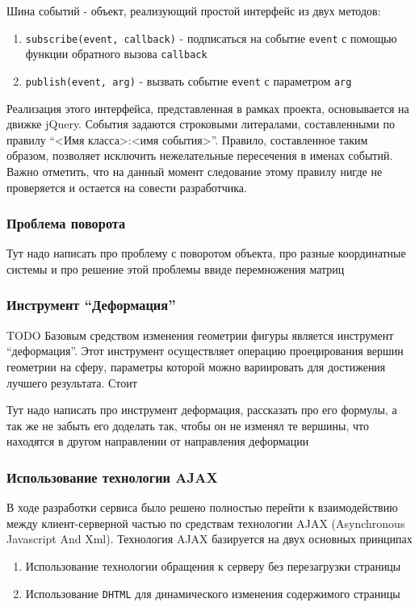\documentclass[12pt, a4paper]{article}
\begin{document}
Шина событий - объект, реализующий простой интерфейс из двух методов:
\begin{enumerate}
    \item \texttt{subscribe(event, callback)} - подписаться на событие
    \texttt{event} с помощью функции обратного вызова \texttt{callback}
    \item \texttt{publish(event, arg)} - вызвать событие
    \texttt{event} с параметром \texttt{arg}
\end{enumerate}

Реализация этого интерфейса, представленная в рамках проекта, основывается на
движке jQuery. События задаются строковыми литералами, составленными по правилу
``<Имя класса>:<имя события>''. Правило, составленное таким образом, позволяет
исключить нежелательные пересечения в именах событий. Важно отметить, что на
данный момент следование этому правилу нигде не проверяется и остается на
совести разработчика.

\subsubsection{Проблема поворота}
Тут надо написать про проблему с поворотом объекта, про разные
координатные системы и про решение этой проблемы ввиде перемножения
матриц
\subsubsection{Инструмент ``Деформация''}
TODO
Базовым средством изменения геометрии фигуры является инструмент ``деформация''.
Этот инструмент осуществляет операцию проецирования вершин геометрии на сферу,
параметры которой можно вариировать для достижения лучшего результата.
Стоит

Тут надо написать про инструмент деформация, рассказать про его формулы,
а так же не забыть его доделать так, чтобы он не изменял те вершины, что
находятся в другом направлении от направления деформации

\subsubsection{Использование технологии AJAX}
В ходе разработки сервиса было решено полностью перейти к взаимодействию между
клиент-серверной частью по средствам технологии AJAX (Asynchronous Javascript
And Xml). Технология AJAX базируется на двух основных принципах
\begin{enumerate}
    \item Использование технологии обращения к серверу без перезагрузки страницы
    \item Использование \texttt{DHTML} для динамического изменения содержимого
    страницы
\end{enumerate}
\end{document}
